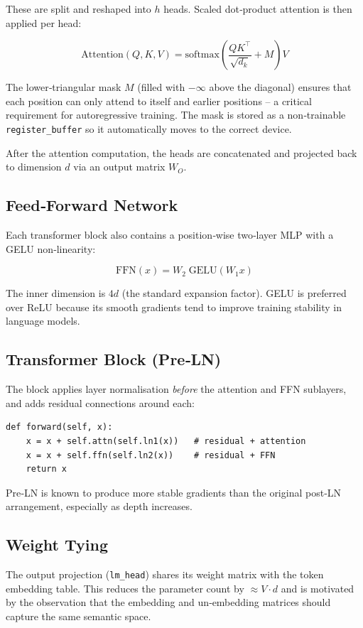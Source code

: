 \documentclass[12pt, a4paper]{article}
\begin{document}
These are split and reshaped into $h$ heads. Scaled dot‑product attention is then applied per head:

\[
  \text{Attention}(Q, K, V) = \text{softmax}\!\left(\frac{QK^{\top}}{\sqrt{d_k}} + M\right)V
\]

The lower‑triangular mask $M$ (filled with $-\infty$ above the diagonal) ensures that each position can only attend to itself and earlier positions – a critical requirement for autoregressive training. The mask is stored as a non‑trainable \texttt{register\_buffer} so it automatically moves to the correct device.

After the attention computation, the heads are concatenated and projected back to dimension $d$ via an output matrix $W_O$.

\subsection{Feed‑Forward Network}

Each transformer block also contains a position‑wise two‑layer MLP with a GELU non‑linearity:

\[
  \text{FFN}(x) = W_2 \; \text{GELU}(W_1 x)
\]

The inner dimension is $4d$ (the standard expansion factor). GELU is preferred over ReLU because its smooth gradients tend to improve training stability in language models.

\subsection{Transformer Block (Pre‑LN)}

The block applies layer normalisation \emph{before} the attention and FFN sublayers, and adds residual connections around each:

\begin{lstlisting}
def forward(self, x):
    x = x + self.attn(self.ln1(x))   # residual + attention
    x = x + self.ffn(self.ln2(x))    # residual + FFN
    return x
\end{lstlisting}

Pre‑LN is known to produce more stable gradients than the original post‑LN arrangement, especially as depth increases.

\subsection{Weight Tying}

The output projection (\texttt{lm\_head}) shares its weight matrix with the token embedding table. This reduces the parameter count by $\approx V \cdot d$ and is motivated by the observation that the embedding and un‑embedding matrices should capture the same semantic space.
\end{document}
